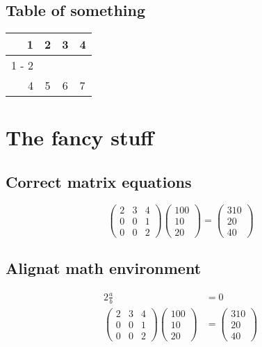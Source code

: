 \documentclass[titlepage]{article}%
\begin{document}
%
\subsection{Table of something}%
\label{subsec:Tableofsomething}%
\begin{tabular}{rc|cl}%
\hline%
1&2&3&4\\%
\cline{1%
-%
2}%
&&&\\%
4&5&6&7\\%
\end{tabular}

%
\section{The fancy stuff}%
\label{sec:Thefancystuff}%
\subsection{Correct matrix equations}%
\label{subsec:Correctmatrixequations}%
\[%
\begin{pmatrix}%
2&3&4\\%
0&0&1\\%
0&0&2%
\end{pmatrix} \begin{pmatrix}%
100\\%
10\\%
20%
\end{pmatrix} = \begin{pmatrix}%
310\\%
20\\%
40%
\end{pmatrix}%
\]

%
\subsection{Alignat math environment}%
\label{subsec:Alignatmathenvironment}%
\begin{alignat*}{2}%
\frac{a}{b} &= 0 \\%
\begin{pmatrix}%
2&3&4\\%
0&0&1\\%
0&0&2%
\end{pmatrix}%
\begin{pmatrix}%
100\\%
10\\%
20%
\end{pmatrix}%
&=%
\begin{pmatrix}%
310\\%
20\\%
40%
\end{pmatrix}%
\end{alignat*}
\end{document}
